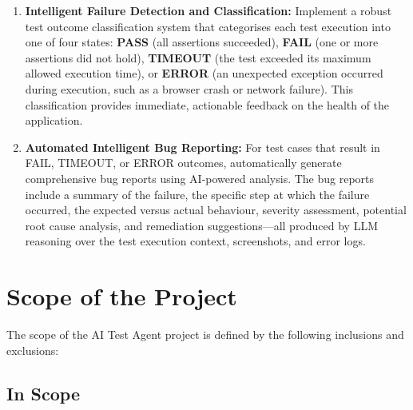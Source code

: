 \begin{enumerate}
    \item \textbf{Intelligent Failure Detection and Classification:} Implement a robust test outcome classification system that categorises each test execution into one of four states: \textbf{PASS} (all assertions succeeded), \textbf{FAIL} (one or more assertions did not hold), \textbf{TIMEOUT} (the test exceeded its maximum allowed execution time), or \textbf{ERROR} (an unexpected exception occurred during execution, such as a browser crash or network failure). This classification provides immediate, actionable feedback on the health of the application.

    \item \textbf{Automated Intelligent Bug Reporting:} For test cases that result in FAIL, TIMEOUT, or ERROR outcomes, automatically generate comprehensive bug reports using AI-powered analysis. The bug reports include a summary of the failure, the specific step at which the failure occurred, the expected versus actual behaviour, severity assessment, potential root cause analysis, and remediation suggestions---all produced by LLM reasoning over the test execution context, screenshots, and error logs.
\end{enumerate}


\section{Scope of the Project}
\label{sec:scope}

The scope of the AI Test Agent project is defined by the following inclusions and exclusions:

\subsection{In Scope}
\label{subsec:in_scope}

